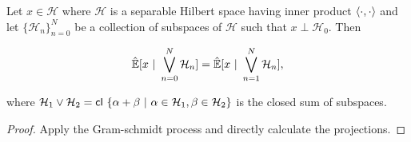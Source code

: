 \documentclass[12pt]{article}
\def\H{\mathcal{H}}  %
\newcommand{\linE}[2]{\hat{\E}[#1\ |\ #2]}  %
\begin{document}

  

\begin{lemma}
  \label{lem:subspace_sum_projection}
  Let $x \in \H$ where $\H$ is a separable Hilbert space having inner product
  $\langle \cdot, \cdot \rangle$ and let $\{\H_n\}_{n = 0}^N$ be a
  collection of subspaces of $\H$ such that $x \perp \H_0$.  Then

  \begin{equation*}
    \linE{x}{\bigvee_{n = 0}^N\H_n} = \linE{x}{\bigvee_{n = 1}^N\H_n},
  \end{equation*}

  where
  $\H_1 \vee \H_2 = \cl \{\alpha + \beta\ |\ \alpha \in \H_1, \beta
  \in \H_2 \}$ is the closed sum of subspaces.
\end{lemma}
\begin{proof}
  Apply the Gram-schmidt process and directly calculate the projections.
\end{proof}  
\end{document}
